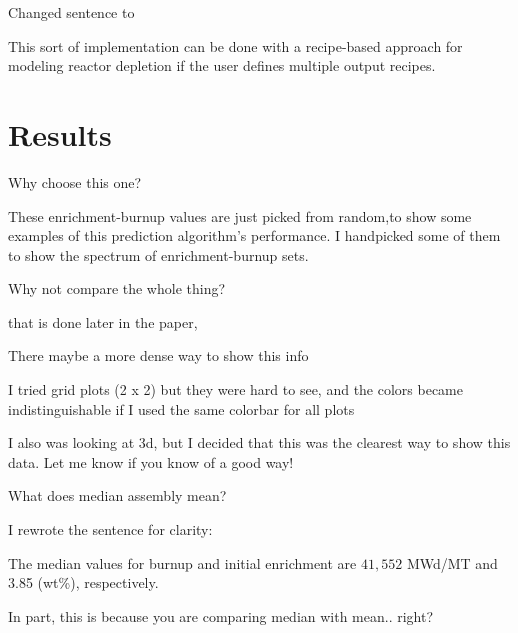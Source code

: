 \documentclass[answers,11pt]{exam}
\begin{document}
\begin{questions}
        \begin{solution}
            Changed sentence to 

            This sort of implementation can be done with
            a recipe-based approach for modeling reactor depletion
            if the user defines multiple
            output recipes. 
        \end{solution}


\section*{Results}
        \question
        Why choose this one?
        \begin{solution}
            These enrichment-burnup values are just picked
            from random,to show some examples of this prediction
            algorithm's performance. I handpicked some of them
            to show the spectrum of enrichment-burnup sets.
        \end{solution}

        \question
        Why not compare the whole thing?
        \begin{solution}
            that is done later in the paper,
        \end{solution}

        \question
        There maybe a more dense way to show this info
        \begin{solution}
            I tried grid plots (2 x 2) but they were hard to see,
            and the colors became indistinguishable if I used the 
            same colorbar for all plots

            I also was looking at 3d, but I decided that this
            was the clearest way to show this data. Let me know
            if you know of a good way!
        \end{solution}

        \question
        What does median assembly mean?

        \begin{solution}
        I rewrote the sentence for clarity:

            The median values for burnup and initial enrichment are
            $41,552$ MWd/MT and 3.85 (wt\%), respectively. 
        \end{solution}


        \question
        In part, this is because you are comparing median with
        mean.. right?


\end{questions}
\end{document}
